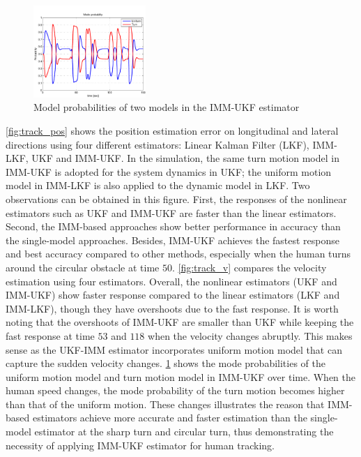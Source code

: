 \documentclass[letterpaper, 10 pt, conference]{ieeeconf}
\newcommand{\todonote}[1]{\vspace{0px} %
	\todo[inline, color=green!30]{\textbf{[Note:]} {#1}} %
}
\begin{document}
	\begin{figure}
		\centering
		\includegraphics[width=0.38\textwidth]{figures/mode_prob}
		\caption{Model probabilities of two models in the IMM-UKF estimator}
		\label{fig:mode_prob}
	\end{figure}
	\cref{fig:track_pos} shows the position estimation error on longitudinal and lateral directions using four different estimators: Linear Kalman Filter (LKF), IMM-LKF, UKF and IMM-UKF. 
	In the simulation, the same turn motion model in IMM-UKF is adopted for the system dynamics in UKF; the uniform motion model in IMM-LKF is also applied to the dynamic model in LKF.  
	Two observations can be obtained in this figure. First, the responses of the nonlinear estimators such as UKF and IMM-UKF are faster than the linear estimators. Second, the IMM-based approaches show better performance in accuracy than the single-model approaches.
	Besides, IMM-UKF achieves the fastest response and best accuracy compared to other methods, especially when the human turns around the circular obstacle at time $50$.
	\cref{fig:track_v} compares the velocity estimation using four estimators.
	Overall, the nonlinear estimators (UKF and IMM-UKF) show faster response compared to the linear estimators (LKF and IMM-LKF), though they have overshoots due to the fast response. 
	It is worth noting that the overshoots of IMM-UKF are smaller than UKF while keeping the fast response at time $53$ and $118$ when the velocity changes abruptly.    
	This makes sense as the UKF-IMM estimator incorporates uniform motion model that can capture the sudden velocity changes.
	\cref{fig:mode_prob} shows the mode probabilities of the uniform motion model and turn motion model in IMM-UKF over time.
	When the human speed changes, the mode probability of the turn motion becomes higher than that of the uniform motion. 
	These changes illustrates the reason that IMM-based estimators achieve more accurate and faster estimation than the single-model estimator at the sharp turn and circular turn, thus demonstrating the necessity of applying IMM-UKF estimator for human tracking.
	
\end{document}
